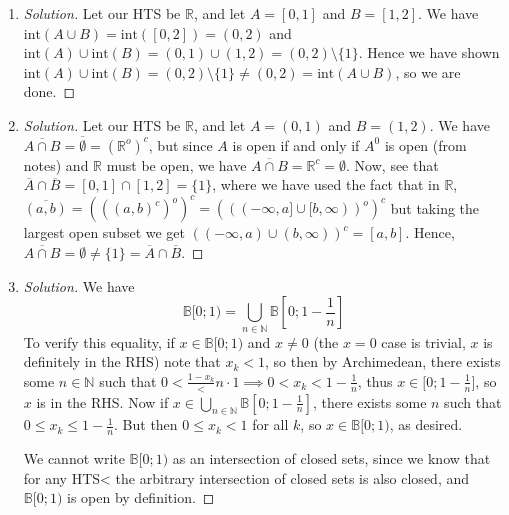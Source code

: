 \documentclass{article}
\newcommand{\N}{{\mathbb N}}
\newcommand{\R}{{\mathbb R}}
\begin{document}
\begin{enumerate}
	\item \begin{proof}[Solution]\let\qed\relax
		Let our HTS be $\R$,
		and let $A = [0,1]$ and $B = [1,2]$.
		We have $\mathrm{int}(A\cup B) = \mathrm{int}([0,2]) = (0,2)$
		and $\mathrm{int}(A) \cup \mathrm{int}(B) = (0,1) \cup (1,2) = (0,2)\setminus \{1\}$.
		Hence we have shown $\mathrm{int}(A)\cup\mathrm{int}(B) = (0,2)\setminus\{1\}
		\neq (0,2) = \mathrm{int}(A\cup B)$,
		so we are done.
	\end{proof}
	\item \begin{proof}[Solution]\let\qed\relax
		Let our HTS be $\R$,
		and let $A = (0,1)$ and $B = (1,2)$.
		We have $\overline{A \cap B} = \overline{\emptyset} = (\R^o)^c$,
		but since $A$ is open if and only if $A^0$ is open (from notes)
		and $\R$ must be open, we have $\overline{A\cap B} = \R^c = \emptyset$.
		Now, see that $\overline{A} \cap \overline{B} = [0,1] \cap [1,2] = \{1\}$,
		where we have used the fact that in $\R$, $\overline{(a,b)} = (((a,b)^c)^o)^c
		= (((-\infty,a]\cup [b,\infty))^o)^c$ but taking the largest
		open subset we get $((-\infty,a)\cup (b,\infty))^c = [a,b]$.
		Hence, $\overline{A \cap B} = \emptyset \neq \{1\} = \overline{A} \cap \overline{B}$.
	\end{proof}
	\item \begin{proof}[Solution]\let\qed\relax
		We have
		\[
			\mathbb{B}[0;1) = \bigcup_{n\in\N} \mathbb{B}\left[0;1-\frac{1}{n}\right]
		\]
		To verify this equality, if $x \in \mathbb{B}[0;1)$ and $x\neq0$
		(the $x = 0$ case is trivial, $x$ is definitely in the RHS)
		note that $x_k < 1$, so
		then by Archimedean, there exists some $n \in \N$ such that
		$0 < \frac{1-x_k} < n\cdot 1 \implies 0 < x_k < 1 - \frac{1}{n}$,
		thus $x \in \mathbb[0;1-\frac{1}{n}]$, so $x$ is in the RHS.
		Now if $x \in \bigcup_{n\in\N}\mathbb{B}[0;1-\frac{1}{n}]$,
		there exists some $n$ such that $0 \leq x_k \leq 1-\frac{1}{n}$.
		But then $0 \leq x_k < 1$ for all $k$,
		so $x \in \mathbb{B}[0;1)$, as desired.

		We cannot write $\mathbb{B}[0;1)$ as an intersection of closed sets,
		since we know that for any HTS< the arbitrary intersection of closed sets is also closed,
		and $\mathbb{B}[0;1)$ is open by definition.
	\end{proof}
\end{enumerate}
\clearpage
~\clearpage
\end{document}
